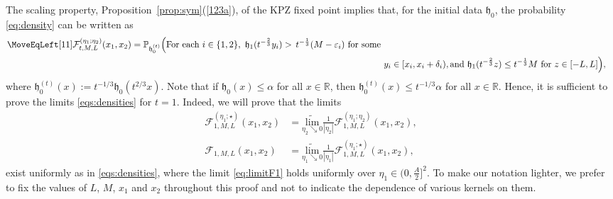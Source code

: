 \documentclass[oneside,final,11pt]{amsart}
\theoremstyle{definition}
\newcommand{\fh}{\mathfrak{h}}
\newcommand{\mylim}[1]{\underset{#1}{\wt{\mathrm{lim}}}}
\newcommand{\R}{\mathbb{R}}
\newcommand{\dens}{\CF}
\newcommand{\1}[1]{\mathbf{1}_{#1}}
\newcommand{\eps}{\varepsilon}
\newcommand{\wt}{\widetilde}
\newcommand{\fx}{x}
\newcommand{\fM}{M}
\newcommand{\CF}{\mathcal{F}}
\renewcommand{\P}{\mathbb P}
\numberwithin{equation}{section}
\begin{document}
The scaling property, Proposition~\ref{prop:sym}(\ref{123a}), of the KPZ fixed point  implies that, for the initial data $\fh_0$, the probability \eqref{eq:density} can be written as
\begin{align}
\MoveEqLeft[11]
\dens_{t, M, L}^{(\eta_1; \eta_2)}(x_1, x_2) = \P_{\fh^{(t)}_0}\Big(\text{For each }i\in \{1,2\},\,\, \fh_{1}(t^{-\frac{2}{3}} y_i) >\,  t^{-\frac{1}{3}}(M - \eps_i) \text{ for some } \\
&y_i \in [x_i, x_i + \delta_i), \text{and } \fh_{1}(t^{-\frac{2}{3}} z) \leq t^{-\frac{1}{3}} M \text{ for } z \in [-L, L]\Big), \label{eq:density2}
\end{align}
where $\fh_0^{(t)}(x) := t^{-1/3}\fh_0(t^{2/3} x)$. Note that if $\fh_0(x) \leq \alpha$ for all $x \in \R$, then $\fh_0^{(t)}(x) \leq t^{-1/3} \alpha$ for all $x \in \R$. Hence, it is sufficient to prove the limits \eqref{eqs:densities} for $t = 1$. Indeed, we will prove that the limits
\begin{subequations}\label{eqs:limitsF}
\begin{align}
\dens^{(\eta_1; \star)}_{1, M, L}(x_1, x_2) &= \mylim{\eta_2 \searrow 0} \frac{1}{|\eta_2|} \dens^{(\eta_1; \eta_2)}_{1, M, L}(x_1, x_2),\label{eq:limitF1}\\
\dens_{1, M, L}(x_1, x_2) &= \mylim{\eta_1 \searrow 0} \frac{1}{|\eta_1|} \dens^{(\eta_1; \star)}_{1, M, L}(x_1, x_2), \label{eq:limitF2}
\end{align}
\end{subequations}
exist uniformly as in \eqref{eqs:densities}, where the limit \eqref{eq:limitF1} holds uniformly over $\eta_1 \in (0, \frac{A}{2}]^2$. To make our notation lighter, we prefer to fix the values of $L$, $\fM$, $\fx_1$ and $\fx_2$ throughout this proof and not to indicate the dependence of various kernels on them.
\end{document}
